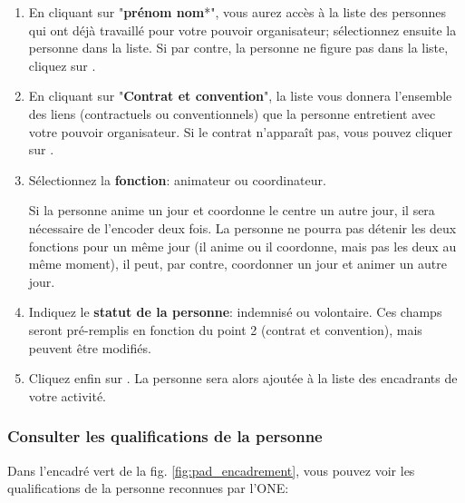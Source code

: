 \begin{enumerate}
    \item En cliquant sur "\textbf{prénom nom}*", vous aurez accès à la liste des personnes qui ont déjà travaillé pour votre pouvoir organisateur; sélectionnez ensuite la personne dans la liste. Si par contre, la personne ne figure pas dans la liste, cliquez sur . 
    
    \item En cliquant sur "\textbf{Contrat et convention}", la liste vous donnera l'ensemble des liens (contractuels ou conventionnels) que la personne entretient avec votre pouvoir organisateur. Si le contrat n'apparaît pas, vous pouvez cliquer sur . 
    
    
    
    \item Sélectionnez la \textbf{fonction}: animateur ou coordinateur. 
        \begin{attention}
         Si la personne anime un jour et coordonne le centre un autre jour, il sera nécessaire de l'encoder deux fois. La personne ne pourra pas détenir les deux fonctions pour un même jour (il anime ou il coordonne, mais pas les deux au même moment), il peut, par contre, coordonner un jour et animer un autre jour.
        \end{attention}
    
    
\item Indiquez le \textbf{statut de la personne}: indemnisé ou volontaire. Ces champs seront pré-remplis en fonction du point 2 (contrat et convention), mais peuvent être modifiés. 
\item Cliquez enfin sur . La personne sera alors ajoutée à la liste des encadrants de votre activité.
\end{enumerate}



\subsubsection{Consulter les qualifications de la personne}

Dans l'encadré \textcolor{vert}{vert} de la fig. \ref{fig:pad_encadrement}, vous pouvez voir les qualifications de la personne reconnues par l'ONE:

